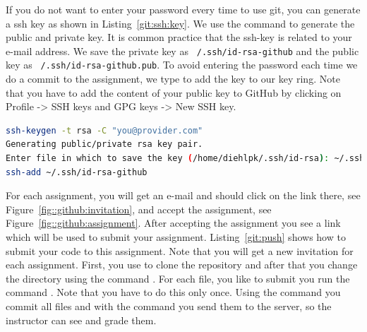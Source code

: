 \documentclass[11pt,fleqn]{book} %
\begin{document}
If you do not want to enter your password every time to use git, you can generate a ssh key as shown in Listing~\ref{git:ssh:key}. We use the command  to generate the public and private key. It is common practice that the ssh-key is related to your e-mail address. We save the private key as \texttt{~/.ssh/id-rsa-github} and the public key as \texttt{~/.ssh/id-rsa-github.pub}. To avoid entering the password each time we do a commit to the assignment, we type  to add the key to our key ring. Note that you have to add the content of your public key to GitHub by clicking on Profile -> SSH keys and GPG keys -> New SSH key. \\

\begin{lstlisting}[language=bash,caption={Setting up a ssh key\label{git:ssh:key}},float,floatplacement=tb]
ssh-keygen -t rsa -C "you@provider.com"
Generating public/private rsa key pair.
Enter file in which to save the key (/home/diehlpk/.ssh/id-rsa): ~/.ssh/id-rsa-github
ssh-add ~/.ssh/id-rsa-github
\end{lstlisting}


For each assignment, you will get an e-mail and should click on the link there, see Figure~\ref{fig::github:invitation}, and accept the assignment, see Figure~\ref{fig::github:assignment}. After accepting the assignment you see a link which will be used to submit your assignment. Listing~\ref{git:push} shows how to submit your code to this assignment. Note that you will get a new invitation for each assignment. First, you use  to clone the repository and after that you change the directory using the command . For each file, you like to submit you run the command . Note that you have to do this only once. Using the command  you commit all files and with the command  you send them to the server, so the instructor can see and grade them.
\end{document}
